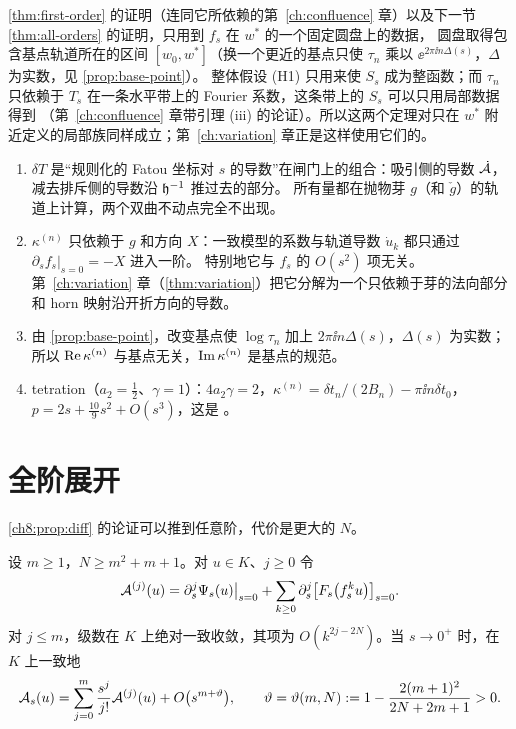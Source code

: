 \begin{remark}[只用局部数据]\label{ch8:rem:local}
\cref{thm:first-order} 的证明（连同它所依赖的第~\ref{ch:confluence} 章）以及下一节 \cref{thm:all-orders} 的证明，只用到 $f_s$ 在 $w^*$ 的一个固定圆盘上的数据，
圆盘取得包含基点轨道所在的区间 $[w_0,w^*]$（换一个更近的基点只使 $\tau_n$ 乘以 $\ee^{2\pi\ii n\Delta(s)}$，$\Delta$ 为实数，见 \cref{prop:base-point}）。
整体假设 (H1) 只用来使 $S_s$ 成为整函数；而 $\tau_n$ 只依赖于 $T_s$ 在一条水平带上的 Fourier 系数，这条带上的 $S_s$ 可以只用局部数据得到
（第~\ref{ch:confluence} 章带引理 (iii) 的论证）。所以这两个定理对只在 $w^*$ 附近定义的局部族同样成立；第~\ref{ch:variation} 章正是这样使用它们的。
\end{remark}

\begin{remark}[公式的结构]\label{ch8:rem:structure}
\begin{enumerate}
\item $\delta T$ 是``规则化的 Fatou 坐标对 $s$ 的导数''在闸门上的组合：吸引侧的导数 $\dot{\mathcal A}$，减去排斥侧的导数沿 $\mathfrak h^{-1}$ 推过去的部分。
  所有量都在抛物芽 $g$（和 $\check g$）的轨道上计算，两个双曲不动点完全不出现。
\item $\kappa^{(n)}$ 只依赖于 $g$ 和方向 $X$：一致模型的系数与轨道导数 $\dot u_k$ 都只通过 $\partial_sf_s|_{s=0}=-X$ 进入一阶。
  特别地它与 $f_s$ 的 $O(s^2)$ 项无关。第~\ref{ch:variation} 章（\cref{thm:variation}）把它分解为一个只依赖于芽的法向部分和 horn 映射沿开折方向的导数。
\item 由 \cref{prop:base-point}，改变基点使 $\log\tau_n$ 加上 $2\pi\ii n\Delta(s)$，$\Delta(s)$ 为实数；所以 $\operatorname{Re}\kappa^{(n)}$ 与基点无关，$\operatorname{Im}\kappa^{(n)}$ 是基点的规范。
\item tetration（$a_2=\frac12$、$\gamma=1$）：$4a_2\gamma=2$，$\kappa^{(n)}=\delta t_n/(2B_n)-\pi\ii n\delta t_0$，$p=2s+\frac{10}9s^2+O(s^3)$，这是 \cite[定理~5.6]{KneserPaper}。
\end{enumerate}
\end{remark}

\section{全阶展开}\label{ch8:sec:higher}

\cref{ch8:prop:diff} 的论证可以推到任意阶，代价是更大的 $N$。

\begin{proposition}[高阶]\label{ch8:prop:higher}
设 $m\ge1$，$N\ge m^2+m+1$。对 $u\in K$、$j\ge0$ 令
\begin{equation}\label{ch8:eq:Aj}
 \mathcal A^{(j)}(u)=\partial_s^j\Psi_s(u)\big|_{s=0}+\sum_{k\ge0}\partial_s^j\bigl[F_s\bigl(f_s^ku\bigr)\bigr]_{s=0}.
\end{equation}
对 $j\le m$，级数在 $K$ 上绝对一致收敛，其项为 $O(k^{2j-2N})$。当 $s\to0^+$ 时，在 $K$ 上一致地
\[
 \mathcal A_s(u)=\sum_{j=0}^m\frac{s^j}{j!}\mathcal A^{(j)}(u)+O\bigl(s^{m+\vartheta}\bigr),\qquad
 \vartheta=\vartheta(m,N):=1-\frac{2(m+1)^2}{2N+2m+1}>0 .
\]
\end{proposition}

